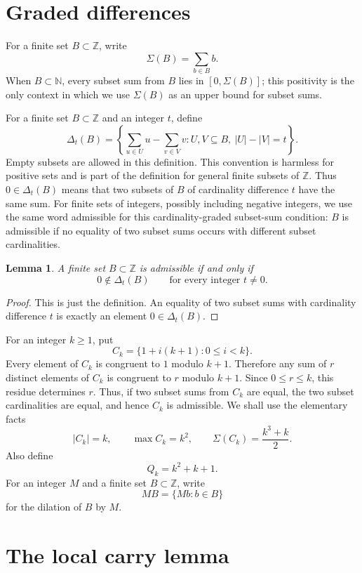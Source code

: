 \documentclass[11pt]{article}
\newtheorem{lemma}{Lemma}
\newcommand{\N}{\mathbb{N}}
\newcommand{\Z}{\mathbb{Z}}
\newcommand{\D}{\Delta}
\newcommand{\Sig}{\Sigma}
\begin{document}
\section{Graded differences}

For a finite set $B\subset\Z$, write
\[
        \Sig(B)=\sum_{b\in B}b.
\]
When $B\subset\N$, every subset sum from $B$ lies in $[0,\Sig(B)]$; this positivity is the only context in which we use $\Sig(B)$ as an upper bound for subset sums.

For a finite set $B\subset\Z$ and an integer $t$, define
\[
\D_t(B)=
\left\{
\sum_{u\in U}u-\sum_{v\in V}v:
U,V\subseteq B,\ |U|-|V|=t
\right\}.
\]
Empty subsets are allowed in this definition.  This convention is harmless for positive sets and is part of the definition for general finite subsets of $\Z$.  Thus $0\in \D_t(B)$ means that two subsets of $B$ of cardinality difference $t$ have the same sum.  For finite sets of integers, possibly including negative integers, we use the same word admissible for this cardinality-graded subset-sum condition: $B$ is admissible if no equality of two subset sums occurs with different subset cardinalities.

\begin{lemma}\label{lem:admissible-delta}
A finite set $B\subset\Z$ is admissible if and only if
\[
        0\notin \D_t(B)\qquad\text{for every integer }t\ne 0.
\]
\end{lemma}

\begin{proof}
This is just the definition.  An equality of two subset sums with cardinality difference $t$ is exactly an element $0\in \D_t(B)$.
\end{proof}

For an integer $k\ge1$, put
\[
        C_k=\{1+i(k+1):0\le i<k\}.
\]
Every element of $C_k$ is congruent to $1$ modulo $k+1$.  Therefore any sum of $r$ distinct elements of $C_k$ is congruent to $r$ modulo $k+1$.  Since $0\le r\le k$, this residue determines $r$.  Thus, if two subset sums from $C_k$ are equal, the two subset cardinalities are equal, and hence $C_k$ is admissible.  We shall use the elementary facts
\[
        |C_k|=k,
        \qquad
        \max C_k=k^2,
        \qquad
        \Sig(C_k)=\frac{k^3+k}{2}.
\]
Also define
\[
        Q_k=k^2+k+1.
\]
For an integer $M$ and a finite set $B\subset\Z$, write
\[
        MB=\{Mb:b\in B\}
\]
for the dilation of $B$ by $M$.

\section{The local carry lemma}
\end{document}
